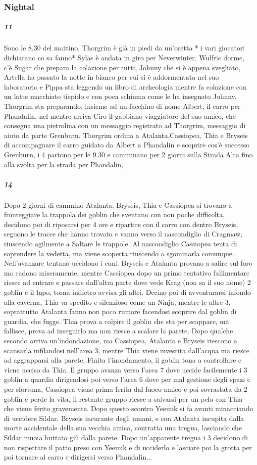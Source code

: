 \documentclass{article}
\begin{document}
    \subsubsection{Nightal}
    \subparagraph{11}
    Sono le 8.30 del mattino, Thorgrim è già in piedi da un’oretta * i vari giocatori dichiarano co sa fanno* Sylas è andata in giro per Neverwinter, Wulfric dorme, c’è Sugar che prepara la colazione per tutti, Johnny che si è appena svegliato, Artella ha passato la notte in bianco per cui si è addormentata nel suo laboratorio e Pippa sta leggendo un libro di archeologia mentre fa colazione con un latte macchiato tiepido e con poca schiuma come le ha insegnato Johnny. Thorgrim sta preparando, insieme ad un facchino di nome Albert, il carro per Phandalin, nel mentre arriva Ciro il gabbiano viaggiatore del suo amico, che consegna una pietrolina con un messaggio registrato ad Thorgrim, messaggio di aiuto da parte Grenburn. Thorgrim ordina a Atalanta,Cassiopea, Thia e Bryseis di accompagnare il carro guidato da Albert a Phandalin e scoprire cos’è successo Grenburn, i 4 partono per le 9.30 e camminano per 2 giorni sulla Strada Alta fino alla svolta per la strada per Phandalin,  
    \subparagraph{14}
    Dopo 2 giorni di cammino Atalanta, Bryseis, Thia e Cassiopea si trovano a fronteggiare la trappola dei goblin che sventano con non poche difficolta, decidono poi di riposarsi per 4 ore e ripartire con il carro con dentro Bryseis, seguono le tracce che hanno trovato e vanno verso il nascondiglio di Cragmaw, riuscendo agilmente a Saltare le trappole. Al nascondiglio Cassiopea tenta di soprendere la vedetta, ma viene scoperta riuscendo a sgominarla comunque. Nell'avanzare tentano uccidono i cani. Bryseis e Atalanta provano a salire sul foro ma cadono miseramente, mentre Cassiopea dopo un primo tentativo fallimentare riesce ad entrare e passare dall'altra parte dove vede Krag (non sa il suo nome) 2 goblin e il lupo, torna indietro avvisa gli altri. Decino poi di avventurarsi infondo alla caverna, Thia va spedito e silenzioso come un Ninja, mentre le altre 3, soprattutto Atalanta fanno non poco rumore facendosi scoprire dal goblin di guardia, che fugge. Thia prova a colpire il goblin che sta per scappare, ma fallisce, prova ad inseguirlo ma non riesce a scalare la parete. Dopo qualche secondo arriva un'indondazione, ma Cassiopea, Atalanta e Bryseis riescono a scansarla infilandosi nell'area 3, mentre Thia viene investita dall'acqua ma riesce ad aggrapparsi alla parete. Finita l'inondamento, il goblin tona a controllare e viene ucciso da Thia. Il gruppo avanza verso l'area 7 dove uccide facilemente i 3 goblin a quardia dirigendosi poi verso l'area 6 dove per mal gestione degli spazi e per sfortuna, Cassiopea viene prima ferita dal fuoco amico e poi sovrastata da 2 goblin e perde la vita, il restante gruppo riesce a salvarsi per un pelo con Thia che viene ferito gravemente. Dopo questo scontro Yeemik si fa avanti minacciando di uccidere Sildar. Bryseis incurante degli umani, e con Atalanta incupita dalla morte accidentale della sua vecchia amica, contratta una tregua, lasciando che Sildar muoia buttato giù dalla parete. Dopo un'apparente tregua i 3 decidono di non rispettare il patto preso con Yeemik e di ucciderlo e lasciare poi la grotta per poi tornare al carro e dirigersi verso Phandalin...  
\end{document}
